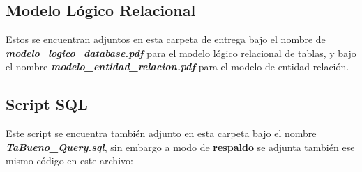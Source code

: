 \documentclass{article}
\begin{document}
\subsection{Modelo Lógico Relacional}
Estos se encuentran adjuntos en esta carpeta de entrega bajo el nombre de
\textbf{\textit{modelo\_logico\_database.pdf}} para el modelo lógico relacional de tablas,
y bajo el nombre \textbf{\textit{modelo\_entidad\_relacion.pdf}} para el modelo
de entidad \- relación.

\subsection{Script SQL}
Este script se encuentra también adjunto en esta carpeta bajo el nombre
\textbf{\textit{TaBueno\_Query.sql}}, sin embargo a modo de \textbf{respaldo}
se adjunta también ese mismo código en este archivo:
\end{document}
